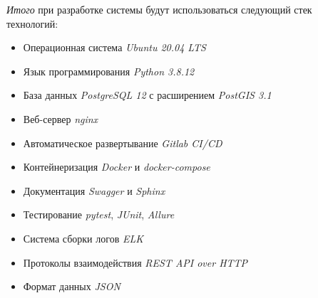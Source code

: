 \noindent \textit{Итого} при разработке системы будут использоваться следующий стек технологий:
\begin{itemize}
    \item Операционная система \textit{Ubuntu 20.04 LTS}
    \item Язык программирования \textit{Python 3.8.12}
    \item База данных \textit{PostgreSQL 12} с расширением \textit{PostGIS 3.1}
    \item Веб-сервер \textit{nginx}
    \item Автоматическое развертывание \textit{Gitlab CI/CD}
    \item Контейнеризация \textit{Docker} и \textit{docker-compose}
    \item Документация \textit{Swagger} и \textit{Sphinx}
    \item Тестирование \textit{pytest}, \textit{JUnit}, \textit{Allure}
    \item Система сборки логов \textit{ELK}
    \item Протоколы взаимодействия \textit{REST API over HTTP}
    \item Формат данных \textit{JSON}
\end{itemize}